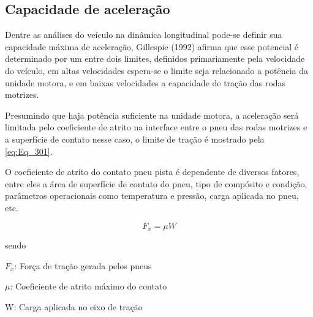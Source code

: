 \subsection{Capacidade de aceleração}

Dentre as análises do veículo na dinâmica longitudinal pode-se definir sua capacidade máxima de aceleração, Gillespie (1992) afirma que esse potencial é determinado por um entre dois limites, definidos primariamente pela velocidade do veículo, em altas velocidades espera-se o limite seja relacionado a potência da unidade motora, e em baixas velocidades a capacidade de tração das rodas motrizes.

Presumindo que haja potência suficiente na unidade motora, a aceleração será limitada pelo coeficiente de atrito na interface entre o pneu das rodas motrizes e a superfície de contato nesse caso, o limite de tração é mostrado pela \autoref{eq:Eq_301}.

O coeficiente de atrito do contato pneu pista é dependente de diversos fatores, entre eles a área de superfície de contato do pneu, tipo de compósito e condição, parâmetros operacionais como temperatura e pressão, carga aplicada no pneu, etc.

\vspace{\baselineskip}

\begin{equation}\label{eq:Eq_301}
F_{x} = \mu W
\end{equation}

sendo

$F_{x}$: Força de tração gerada pelos pneus

$\mu$: Coeficiente de atrito máximo do contato

W: Carga aplicada no eixo de tração

\vspace{\baselineskip}


